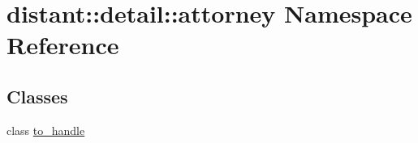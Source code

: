 \hypertarget{namespacedistant_1_1detail_1_1attorney}{}\section{distant\+:\+:detail\+:\+:attorney Namespace Reference}
\label{namespacedistant_1_1detail_1_1attorney}
\subsection*{Classes}
\begin{DoxyCompactItemize}
\item 
class \mbox{\hyperlink{classdistant_1_1detail_1_1attorney_1_1to__handle}{to\+\_\+handle}}
\end{DoxyCompactItemize}
